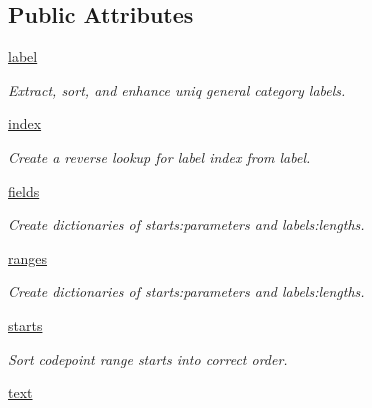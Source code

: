 \subsection*{Public Attributes}
\begin{DoxyCompactItemize}
\item 
\hyperlink{classc_1_1_classify_1_1_classify_a39504bd936bf5576befb10e0ac43d83f}{label}
\begin{DoxyCompactList}\small\item\em Extract, sort, and enhance uniq general category labels. \end{DoxyCompactList}\item 
\hyperlink{classc_1_1_classify_1_1_classify_a4f7fa627ce6c996d15b94b95fc308efd}{index}\hypertarget{classc_1_1_classify_1_1_classify_a4f7fa627ce6c996d15b94b95fc308efd}{}\label{classc_1_1_classify_1_1_classify_a4f7fa627ce6c996d15b94b95fc308efd}

\begin{DoxyCompactList}\small\item\em Create a reverse lookup for label index from label. \end{DoxyCompactList}\item 
\hyperlink{classc_1_1_classify_1_1_classify_ae16c6fab346508b48b720cd04e9ce7df}{fields}
\begin{DoxyCompactList}\small\item\em Create dictionaries of starts\+:parameters and labels\+:lengths. \end{DoxyCompactList}\item 
\hyperlink{classc_1_1_classify_1_1_classify_a1e4a9a02e19f108821677534f7e8d60a}{ranges}
\begin{DoxyCompactList}\small\item\em Create dictionaries of starts\+:parameters and labels\+:lengths. \end{DoxyCompactList}\item 
\hyperlink{classc_1_1_classify_1_1_classify_afdb329410c16ea92a7ac17476f576fde}{starts}
\begin{DoxyCompactList}\small\item\em Sort codepoint range starts into correct order. \end{DoxyCompactList}\item 
\hyperlink{classc_1_1_classify_1_1_classify_a301a21d13817bbbbf07d6af1226c244a}{text}\hypertarget{classc_1_1_classify_1_1_classify_a301a21d13817bbbbf07d6af1226c244a}{}\label{classc_1_1_classify_1_1_classify_a301a21d13817bbbbf07d6af1226c244a}


\end{DoxyCompactItemize}
